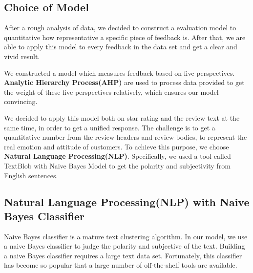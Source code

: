 \documentclass{mcmthesis}
\begin{document}

    
    
\subsection{Choice of Model}

    After a rough analysis of data, we decided to construct a evaluation model to quantitative how representative a specific piece of feedback is. After that, we are able to apply this model to every feedback in the data set and get a clear and vivid result.
    
    We constructed a model which measures feedback based on five perspectives. \textbf{Analytic Hierarchy Process(AHP)} are used to process data provided to get the weight of these five perspectives relatively, which ensures our model convincing.
    
    We decided to apply this model both on star rating and the review text at the same time, in order to get a unified response. The challenge is to get a quantitative number from the review headers and review bodies, to represent the real emotion and attitude of customers. To achieve this purpose, we choose \textbf{Natural Language Processing(NLP)}. Specifically, we used a tool called TextBlob with Naive Bayes Model to get the polarity and subjectivity from English sentences.
    




\subsection{Natural Language Processing(NLP) with Naive Bayes Classifier}
    Naive Bayes classifier is a mature text clustering algorithm. In our model, we use a naive Bayes classifier to judge the polarity and subjective of the text. Building a naive Bayes classifier requires a large text data set. Fortunately, this classifier has become so popular that a large number of off-the-shelf tools are available.
    
\end{document}
